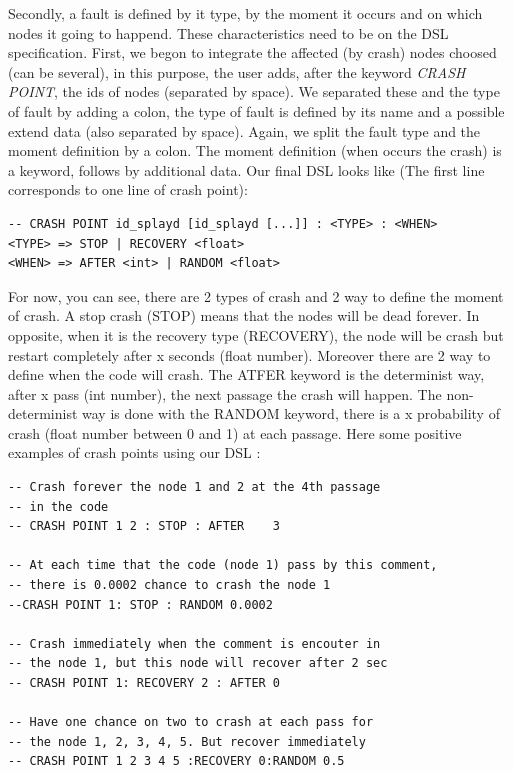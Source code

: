 \documentclass{eplmastersthesis}
\begin{document}
        Secondly, a fault is defined by it type, by the moment it occurs and on which nodes it going to happend.
        These characteristics need to be on the DSL specification. First, we begon to integrate the affected (by crash) nodes choosed
        (can be several), in this purpose, the user adds, after the keyword \textit{CRASH POINT},
        the ids of nodes (separated by space). We separated these and the type of fault by adding a colon, the type
        of fault is defined by its name and a possible extend data (also separated by space). Again, we split the
        fault type and the moment definition by a colon. The moment definition (when occurs the crash) is a keyword, follows
        by additional data. Our final DSL looks like (The first line corresponds to one line of crash point):
        \begin{lstlisting}[style=MyBash]
-- CRASH POINT id_splayd [id_splayd [...]] : <TYPE> : <WHEN>
<TYPE> => STOP | RECOVERY <float>
<WHEN> => AFTER <int> | RANDOM <float>
        \end{lstlisting}
        For now, you can see, there are 2 types of crash and 2 way to define the moment of crash. A stop crash (STOP) means that
        the nodes will be dead forever. In opposite, when it is the recovery type (RECOVERY), the node will be crash but restart
        completely after x seconds (float number). Moreover there are 2 way to define when the code will crash. The ATFER keyword
        is the determinist way, after x pass (int number), the next passage the crash will happen. The non-determinist way is
        done with the RANDOM keyword, there is a x probability of crash (float number between 0 and 1) at each passage.
        Here some positive examples of crash points using our DSL :

        \begin{lstlisting}[style=MyLua]
-- Crash forever the node 1 and 2 at the 4th passage
-- in the code
-- CRASH POINT 1 2 : STOP : AFTER    3

-- At each time that the code (node 1) pass by this comment,
-- there is 0.0002 chance to crash the node 1
--CRASH POINT 1: STOP : RANDOM 0.0002

-- Crash immediately when the comment is encouter in
-- the node 1, but this node will recover after 2 sec
-- CRASH POINT 1: RECOVERY 2 : AFTER 0

-- Have one chance on two to crash at each pass for
-- the node 1, 2, 3, 4, 5. But recover immediately
-- CRASH POINT 1 2 3 4 5 :RECOVERY 0:RANDOM 0.5
          \end{lstlisting}
\end{document}
